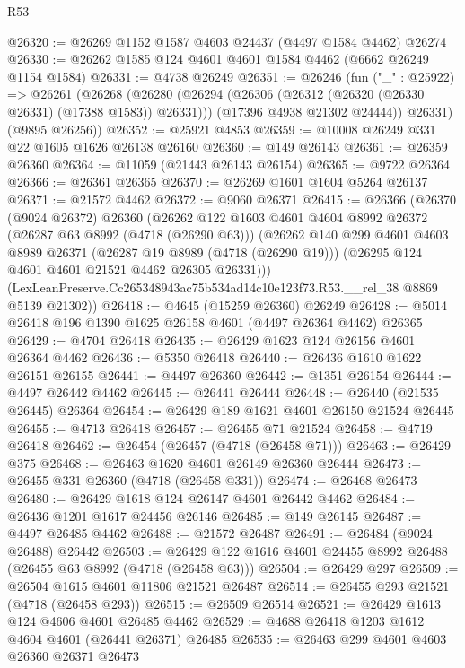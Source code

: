\begin{lexlean}{R53}
\begin{coremodule}
@26320 := @26269 @1152 @1587 @4603 @24437 (@4497 @1584 @4462) @26274
@26330 := @26262 @1585 @124 @4601 @4601 @1584 @4462 (@6662 @26249 @1154 @1584)
@26331 := @4738 @26249
@26351 := @26246
    (fun ("_" : @25922) =>
    @26261
      (@26268
        (@26280
          (@26294 (@26306 (@26312 (@26320 (@26330 @26331) (@17388 @1583)) @26331)))
          (@17396 @4938 @21302 @24444))
        @26331)
      (@9895 @26256))
@26352 := @25921 @4853
@26359 := @10008 @26249 @331 @22 @1605 @1626 @26138 @26160
@26360 := @149 @26143
@26361 := @26359 @26360
@26364 := @11059 (@21443 @26143 @26154)
@26365 := @9722 @26364
@26366 := @26361 @26365
@26370 := @26269 @1601 @1604 @5264 @26137
@26371 := @21572 @4462
@26372 := @9060 @26371
@26415 := @26366
    (@26370
      (@9024 @26372)
      @26360
      (@26262
        @122
        @1603
        @4601
        @4604
        @8992
        @26372
        (@26287 @63 @8992 (@4718 (@26290 @63)))
        (@26262
          @140
          @299
          @4601
          @4603
          @8989
          @26371
          (@26287 @19 @8989 (@4718 (@26290 @19)))
          (@26295 @124 @4601 @4601 @21521 @4462 @26305 @26331)))
      (LexLeanPreserve.Cc265348943ac75b534ad14c10e123f73.R53.__rel_38 @8869 @5139 @21302))
@26418 := @4645 (@15259 @26360) @26249
@26428 := @5014 @26418 @196 @1390 @1625 @26158 @4601 (@4497 @26364 @4462) @26365
@26429 := @4704 @26418
@26435 := @26429 @1623 @124 @26156 @4601 @26364 @4462
@26436 := @5350 @26418
@26440 := @26436 @1610 @1622 @26151 @26155
@26441 := @4497 @26360
@26442 := @1351 @26154
@26444 := @4497 @26442 @4462
@26445 := @26441 @26444
@26448 := @26440 (@21535 @26445) @26364
@26454 := @26429 @189 @1621 @4601 @26150 @21524 @26445
@26455 := @4713 @26418
@26457 := @26455 @71 @21524
@26458 := @4719 @26418
@26462 := @26454 (@26457 (@4718 (@26458 @71)))
@26463 := @26429 @375
@26468 := @26463 @1620 @4601 @26149 @26360 @26444
@26473 := @26455 @331 @26360 (@4718 (@26458 @331))
@26474 := @26468 @26473
@26480 := @26429 @1618 @124 @26147 @4601 @26442 @4462
@26484 := @26436 @1201 @1617 @24456 @26146
@26485 := @149 @26145
@26487 := @4497 @26485 @4462
@26488 := @21572 @26487
@26491 := @26484 (@9024 @26488) @26442
@26503 := @26429 @122 @1616 @4601 @24455 @8992 @26488 (@26455 @63 @8992 (@4718 (@26458 @63)))
@26504 := @26429 @297
@26509 := @26504 @1615 @4601 @11806 @21521 @26487
@26514 := @26455 @293 @21521 (@4718 (@26458 @293))
@26515 := @26509 @26514
@26521 := @26429 @1613 @124 @4606 @4601 @26485 @4462
@26529 := @4688 @26418 @1203 @1612 @4604 @4601 (@26441 @26371) @26485
@26535 := @26463 @299 @4601 @4603 @26360 @26371 @26473

\end{coremodule}
\end{lexlean}
